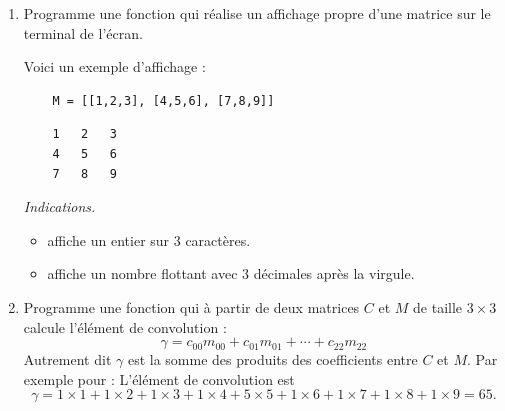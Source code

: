 \documentclass[11pt,class=report,crop=false]{standalone}
\begin{document}
\begin{activite}
	
		
\begin{enumerate}
	\item Programme une fonction  qui réalise un affichage propre d'une matrice sur le terminal de l'écran.
	

	Voici un exemple d'affichage :
	
\begin{center}
	\begin{minipage}{0.6\textwidth}
	\begin{center}
	\begin{lstlisting}
	M = [[1,2,3], [4,5,6], [7,8,9]]	
	\end{lstlisting}		
	\end{center}	
	\end{minipage}
	\begin{minipage}{0.3\textwidth}
	\begin{center}
	\begin{lstlisting}
	1   2   3 
	4   5   6 
	7   8   9	
	\end{lstlisting}
	\end{center}
	\end{minipage}
\end{center}



	\emph{Indications.}
	\begin{itemize}
		\item {} affiche un entier sur $3$ caractères.
		\item {} affiche un nombre flottant avec $3$ décimales après la virgule.
	\end{itemize}
			
	\item Programme une fonction  qui à partir de deux matrices $C$ et $M$ de taille $3\times 3$ calcule l'élément de convolution :
	$$\gamma = c_{00}m_{00} + c_{01}m_{01} + \cdots + c_{22}m_{22}$$
	Autrement dit $\gamma$ est la somme des produits des coefficients entre $C$ et $M$.
	Par exemple pour :	
	L'élément de convolution est $$\gamma = 1\times 1 + 1\times 2 + 	1\times 3 + 1\times 4 + 5 \times 5 + 1\times 6 + 1\times 7 + 	1\times 8 + 1\times 9 = 65.$$


\end{enumerate}
\end{activite}
\end{document}
